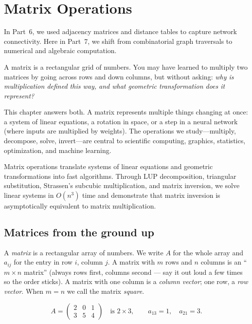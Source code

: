 \providecommand{\norm}[1]{\left\lVert #1 \right\rVert}

\chapter{Matrix Operations}

In Part~6, we used adjacency matrices and distance tables to capture network connectivity. Here in Part~7, we shift from combinatorial graph traversals to numerical and algebraic computation.

A matrix is a rectangular grid of numbers. You may have learned to multiply two matrices by going across rows and down columns, but without asking: \emph{why is multiplication defined this way, and what geometric transformation does it represent?}

This chapter answers both. A matrix represents multiple things changing at once: a system of linear equations, a rotation in space, or a step in a neural network (where inputs are multiplied by weights). The operations we study---multiply, decompose, solve, invert---are central to scientific computing, graphics, statistics, optimization, and machine learning.

\begin{focusbox}
Matrix operations translate systems of linear equations and geometric transformations into fast algorithms. Through LUP decomposition, triangular substitution, Strassen's subcubic multiplication, and matrix inversion, we solve linear systems in $O(n^3)$ time and demonstrate that matrix inversion is asymptotically equivalent to matrix multiplication.
\end{focusbox}

\section{Matrices from the ground up}

A \emph{matrix} is a rectangular array of numbers. We write $A$ for the whole
array and $a_{ij}$ for the entry in row $i$, column $j$. A matrix with $m$ rows
and $n$ columns is an ``$m \times n$ matrix'' (always rows first, columns
second --- say it out loud a few times so the order sticks). A matrix with one
column is a \emph{column vector}; one row, a \emph{row vector}. When $m=n$ we call
the matrix \emph{square}.

$$
A=\begin{pmatrix} 2 & 0 & 1\\ 3 & 5 & 4 \end{pmatrix}
\quad\text{is } 2\times 3,\qquad a_{13}=1,\quad a_{21}=3.
$$

